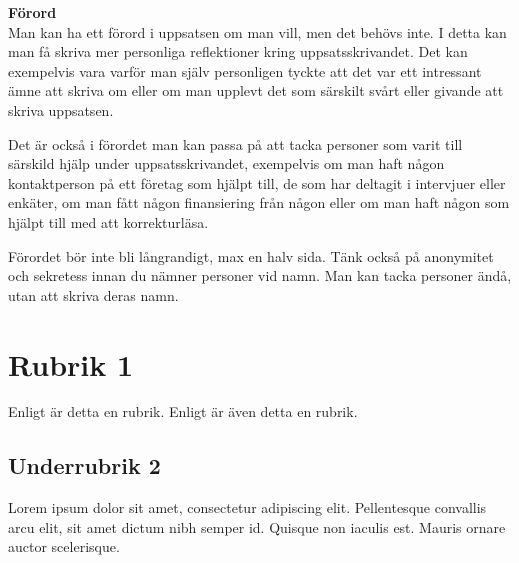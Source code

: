 \documentclass[a4paper,12pt]{article} %
\begin{document}
\newpage

\noindent\textbf{\large{Förord}}\\

\noindent Man kan ha ett förord i uppsatsen om man vill, men det behövs inte. I detta kan man få skriva mer personliga reflektioner kring uppsatsskrivandet. Det kan exempelvis vara varför man själv personligen tyckte att det var ett intressant ämne att skriva om eller om man upplevt det som särskilt svårt eller givande att skriva uppsatsen. 

Det är också i förordet man kan passa på att tacka personer som varit till särskild hjälp under uppsatsskrivandet, exempelvis om man haft någon kontaktperson på ett företag som hjälpt till, de som har deltagit i intervjuer eller enkäter, om man fått någon finansiering från någon eller om man haft någon som hjälpt till med att korrekturläsa. 

Förordet bör inte bli långrandigt, max en halv sida. Tänk också på anonymitet och sekretess innan du nämner personer vid namn. Man kan tacka personer ändå, utan att skriva deras namn. 

\newpage
{} %
\tableofcontents %
\newpage %



\section{Rubrik 1}
Enligt \cite{small} är detta en rubrik. Enligt \cite{big} är även detta en rubrik.
\subsection{Underrubrik 2}
Lorem ipsum dolor sit amet, consectetur adipiscing elit. Pellentesque convallis arcu elit, sit amet dictum nibh semper id. Quisque non iaculis est. Mauris ornare auctor scelerisque.
\end{document}
